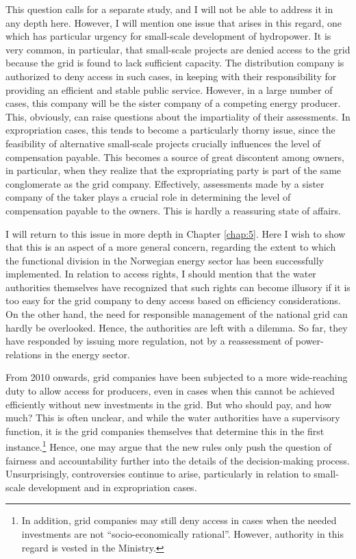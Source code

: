 This question calls for a separate study, and I will not be able to address it in any depth here. However, I will mention one issue that arises in this regard, one which has particular urgency for small-scale development of hydropower. It is very common, in particular, that small-scale projects are denied access to the grid because the grid is found to lack sufficient capacity. The distribution  company is authorized to deny access in such cases, in keeping with their responsibility for providing an efficient and stable public service. However, in a large number of cases, this company will be the sister company of a competing energy producer. This, obviously, can raise questions about the impartiality of their assessments. In expropriation cases, this tends to become a particularly thorny issue, since the feasibility of alternative small-scale projects crucially influences the level of compensation payable. This becomes a source of great discontent among owners, in particular, when they realize that the expropriating party is part of the same conglomerate as the grid company. Effectively, assessments made by a sister company of the taker plays a crucial role in determining the level of compensation payable to the owners. This is hardly a reassuring state of affairs.

I will return to this issue in more depth in Chapter \ref{chap:5}. Here I wish to show that this is an aspect of a more general concern, regarding the extent to which the functional division in the Norwegian energy sector has been successfully implemented. In relation to access rights, I should mention that the water authorities themselves have recognized that such rights can become illusory if it is too easy for the grid company to deny access based on efficiency considerations. On the other hand, the need for responsible management of the national grid can hardly be overlooked. Hence, the authorities are left with a dilemma. So far, they have responded by issuing more regulation, not by a reassessment of power-relations in the energy sector.

From 2010 onwards, grid companies have been subjected to a more wide-reaching duty to allow access for producers, even in cases when this cannot be achieved efficiently without new investments in the grid. But who should pay, and how much? This is often unclear, and while the water authorities have a supervisory function, it is the grid companies themselves that determine this in the first instance.\footnote{In addition, grid companies may still deny access in cases when the needed investments are not ``socio-economically rational''. However, authority in this regard is vested in the Ministry.} Hence, one may argue that the new rules only push the question of fairness and accountability further into the details of the decision-making process. Unsurprisingly, controversies continue to arise, particularly in relation to small-scale development and in expropriation cases.

